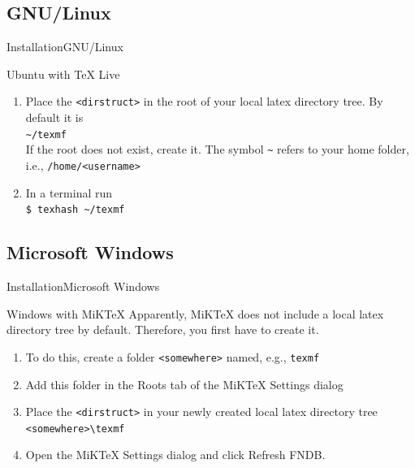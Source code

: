 \documentclass[10pt]{beamer}
\begin{document}
\subsection{GNU/Linux}
\begin{frame}{Installation}{GNU/Linux}
  \begin{block}{Ubuntu with TeX Live}
    \begin{enumerate}
      \item Place the {\tt <dirstruct>} in the root of your local latex directory tree. By default it is\\
        {\tt \textasciitilde /texmf}\\
        If the root does not exist, create it. The symbol {\tt \textasciitilde} refers to your home folder, i.e., {\tt /home/<username>}
      \item In a terminal run\\
        {\tt \$ texhash \textasciitilde /texmf}
    \end{enumerate}
  \end{block}
\end{frame}

\subsection{Microsoft Windows}
\begin{frame}{Installation}{Microsoft Windows}
  \begin{block}{Windows with MiKTeX}
    Apparently, MiKTeX does not include a local latex directory tree by default. Therefore, you first have to create it.
    \begin{enumerate}
      \item To do this, create a folder {\tt <somewhere>} named, e.g., {\tt texmf}
      \item Add this folder in the Roots tab of the MiKTeX Settings dialog
      \item Place the {\tt <dirstruct>} in your newly created local latex directory tree\\
    {\tt <somewhere>\textbackslash texmf}\\
      \item Open the MiKTeX Settings dialog and click Refresh FNDB.
    \end{enumerate}
  \end{block}
\end{frame}
\end{document}

